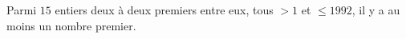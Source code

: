 Parmi $15$ entiers deux à deux premiers entre eux, tous $> 1$ et $\leq 1992$, il y a au moins un nombre premier.
